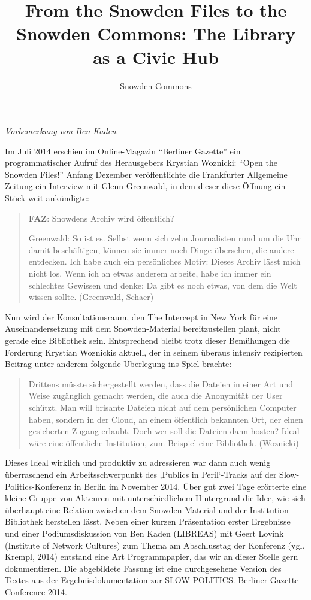 \documentclass[a4paper,
fontsize=11pt,
oneside,
numbers=noperiodatend,
parskip=half-,
bibliography=totoc,
final
]{scrartcl}
\title{\LARGE{From the Snowden Files to the Snowden Commons: The Library as a Civic Hub}} %
\author{Snowden Commons} %
\date{}
\begin{document}
\maketitle
\thispagestyle{fancyplain} 


\emph{Vorbemerkung von Ben Kaden}

Im Juli 2014 erschien im Online-Magazin \enquote{Berliner Gazette} ein
programmatischer Aufruf des Herausgebers Krystian Woznicki:
\enquote{Open the Snowden Files!} Anfang Dezember veröffentlichte die
Frankfurter Allgemeine Zeitung ein Interview mit Glenn Greenwald, in dem
dieser diese Öffnung ein Stück weit ankündigte:

\begin{quote}
\textbf{FAZ}: Snowdens Archiv wird öffentlich?

Greenwald: So ist es. Selbst wenn sich zehn Journalisten rund um die Uhr
damit beschäftigen, können sie immer noch Dinge übersehen, die andere
entdecken. Ich habe auch ein persönliches Motiv: Dieses Archiv lässt
mich nicht los. Wenn ich an etwas anderem arbeite, habe ich immer ein
schlechtes Gewissen und denke: Da gibt es noch etwas, von dem die Welt
wissen sollte. (Greenwald, Schaer)
\end{quote}

Nun wird der Konsultationsraum, den The Intercept in New York für eine
Auseinandersetzung mit dem Snowden-Material bereitzustellen plant, nicht
gerade eine Bibliothek sein. Entsprechend bleibt trotz dieser Bemühungen
die Forderung Krystian Woznickis aktuell, der in seinem überaus intensiv
rezipierten Beitrag unter anderem folgende Überlegung ins Spiel brachte:

\begin{quote}
Drittens müsste sichergestellt werden, dass die Dateien in einer Art und
Weise zugänglich gemacht werden, die auch die Anonymität der User
schützt. Man will brisante Dateien nicht auf dem persönlichen Computer
haben, sondern in der Cloud, an einem öffentlich bekannten Ort, der
einen gesicherten Zugang erlaubt. Doch wer soll die Dateien dann hosten?
Ideal wäre eine öffentliche Institution, zum Beispiel eine Bibliothek.
(Woznicki)
\end{quote}

Dieses Ideal wirklich und produktiv zu adressieren war dann auch wenig
überraschend ein Arbeitsschwerpunkt des ‚Publics in Peril`-Tracks auf
der Slow-Politics-Konferenz in Berlin im November 2014. Über gut zwei
Tage erörterte eine kleine Gruppe von Akteuren mit unterschiedlichem
Hintergrund die Idee, wie sich überhaupt eine Relation zwischen dem
Snowden-Material und der Institution Bibliothek herstellen lässt. Neben
einer kurzen Präsentation erster Ergebnisse und einer Podiumsdiskussion
von Ben Kaden (LIBREAS) mit Geert Lovink (Institute of Network Cultures)
zum Thema am Abschlusstag der Konferenz (vgl. Krempl, 2014) entstand
eine Art Programmpapier, das wir an dieser Stelle gern dokumentieren.
Die abgebildete Fassung ist eine durchgesehene Version des Textes aus
der Ergebnisdokumentation zur SLOW POLITICS. Berliner Gazette Conference
2014.
\end{document}
